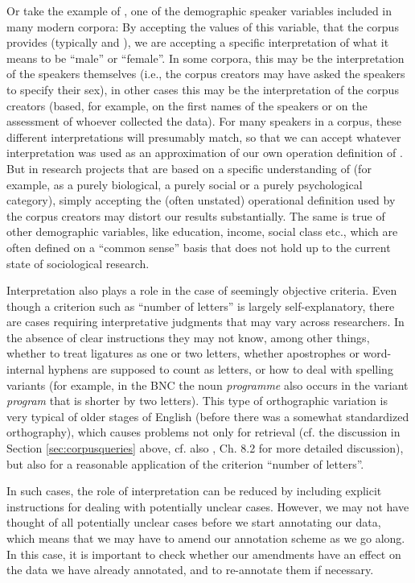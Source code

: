 Or take the example of , one of the demographic speaker variables included in many modern corpora: By accepting the values of this variable, that the corpus provides (typically  and ), we are accepting a specific interpretation of what it means to be ``male'' or ``female''. In some corpora, this may be the interpretation of the speakers themselves (i.e., the corpus creators may have asked the speakers to specify their sex), in other cases this may be the interpretation of the corpus creators (based, for example, on the first names of the speakers or on the assessment of whoever collected the data). For many speakers in a corpus, these different interpretations will presumably match, so that we can accept whatever interpretation was used as an approximation of our own operation definition of . But in research projects that are based on a specific understanding of  (for example, as a purely biological, a purely social or a purely psychological category), simply accepting the (often unstated) operational definition used by the corpus creators may distort our results substantially. The same is true of other demographic variables, like education, income, social class etc., which are often defined on a ``common sense'' basis that does not hold up to the current state of sociological research.

Interpretation also plays a role in the case of seemingly objective criteria. Even though a criterion such as ``number of letters'' is largely self\hyp{}explanatory, there are cases requiring interpretative judgments that may vary across researchers. In the absence of clear instructions they may not know, among other things, whether to treat ligatures as one or two letters, whether apostrophes or word-internal hyphens are supposed to count as letters, or how to deal with spelling variants (for example, in the BNC the noun \textit{programme} also occurs in the variant \textit{program} that is shorter by two letters). This type of orthographic variation is very typical of older stages of English (before there was a somewhat standardized orthography), which causes problems not only for retrieval (cf. the discussion in Section \ref{sec:corpusqueries} above, cf. also \citet{barnbrook_language_1996}, Ch. 8.2 for more detailed discussion), but also for a reasonable application of the criterion ``number of letters''.

In such cases, the role of interpretation can be reduced by including explicit instructions for dealing with potentially unclear cases. However, we may not have thought of all potentially unclear cases before we start annotating our data, which means that we may have to amend our annotation scheme as we go along. In this case, it is important to check whether our amendments have an effect on the data we have already annotated, and to re-annotate them if necessary.

